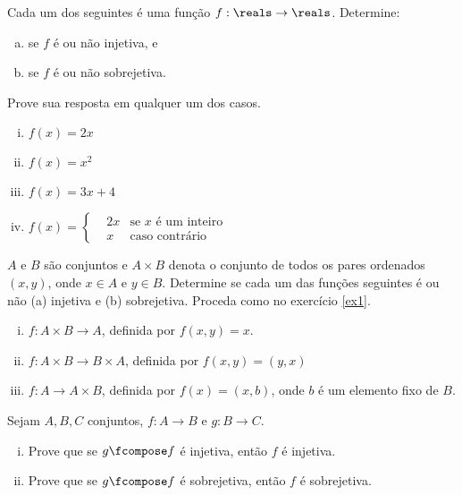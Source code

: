 \begin{exercise}
\label{ex1}
    Cada um dos seguintes é uma função $f : \reals \to \reals$. Determine:
    \begin{enumerate}[(a)]
        \item se $f$ é ou não injetiva, e
        \item se $f$ é ou não sobrejetiva.
    \end{enumerate}
    Prove sua resposta em qualquer um dos casos.

    \begin{enumerate}[(i)]
        \item $f(x) = 2x$
        \item $f(x) = x^2$
        \item $f(x) = 3x + 4$
        \item $f(x) = \left \{ \begin{aligned}
                        &2x &\text{se $x$ é um inteiro}\\
                        &x  &\text{caso contrário}
                         \end{aligned}
                      \right.$
    \end{enumerate}
\end{exercise}

\begin{exercise}
    $A$ e $B$ são conjuntos e $A \times B$ denota o conjunto de todos os pares ordenados $(x,y)$, onde $x \in A$ e $y \in B$. Determine se cada um das funções seguintes é ou não (a) injetiva e (b) sobrejetiva. Proceda como no exercício \ref{ex1}.
    \begin{enumerate}[(i)]
        \item $f : A \times B \to A$, definida por $f(x,y) = x$.
        \item $f : A \times B \to B \times A$, definida por $f(x,y) = (y,x)$
        \item $f : A \to A \times B$, definida por $f(x) = (x,b)$, onde $b$ é um elemento fixo de $B$.
    \end{enumerate}
\end{exercise}

\begin{exercise}
    Sejam $A,B,C$ conjuntos, $f : A \to B$ e $g : B \to C$.
    \begin{enumerate}[(i)]
        \item Prove que se $g \fcompose f$ é injetiva, então $f$ é injetiva.
        \item Prove que se $g \fcompose f$ é sobrejetiva, então $f$ é sobrejetiva.
    \end{enumerate}
\end{exercise}
